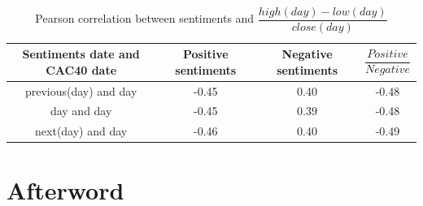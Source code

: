 \documentclass[12pt]{report}
\begin{document}
\begin{table}
	\begin{tabular}{|c || c | c | c|}
		\hline
		Sentiments date and CAC40 date & Positive sentiments & Negative sentiments & $\dfrac{Positive}{Negative}$\\
		\hline
		previous(day) and day & -0.45 & 0.40 & -0.48\\
		\hline
		day and day & -0.45 & 0.39 & -0.48\\
		\hline
		next(day) and day & -0.46 & 0.40 & -0.49\\
		\hline
	\end{tabular}

	\caption{Pearson correlation between sentiments and $\dfrac{high(day) - low(day)}{close(day)}$\label{pearson_highlow}}
\end{table}

\chapter{Afterword}



\end{document}
